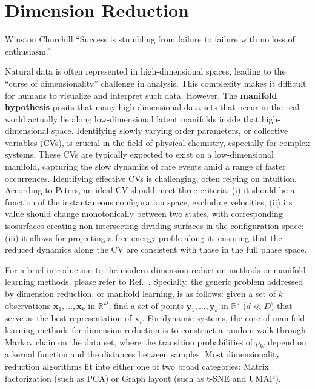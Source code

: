 \chapter{Dimension Reduction\label{chapter:DR}}
\begin{chapquote}{Winston Churchill%
	}
	``Success is stumbling from failure to failure with no loss of enthusiasm.''
\end{chapquote}

Natural data is often represented in high-dimensional spaces, leading to the ``curse of dimensionality'' challenge in analysis. This complexity makes it difficult for humans to visualize and interpret such data. However, The \textbf{manifold hypothesis} posits that many high-dimensional data sets that occur in the real world actually lie along low-dimensional latent manifolds inside that high-dimensional space. Identifying slowly varying order parameters, or collective variables (CVs), is crucial in the field of physical chemistry, especially for complex systems. These CVs are typically expected to exist on a low-dimensional manifold, capturing the slow dynamics of rare events amid a range of faster occurrences. Identifying effective CVs is challenging, often relying on intuition. According to Peters\cite{PetersARPC2016}, an ideal CV should meet three criteria: (i) it should be a function of the instantaneous configuration space, excluding velocities; (ii) its value should change monotonically between two states, with corresponding isosurfaces creating non-intersecting dividing surfaces in the configuration space; (iii) it allows for projecting a free energy profile along it, ensuring that the reduced dynamics along the CV are consistent with those in the full phase space.

For a brief introduction to the modern dimension reduction methods or manifold learning methods, please refer to Ref.~\cite{IzamanWIREsCS2012}. Specially, the generic problem addressed by dimension reduction, or manifold learning, is as follows: given a set of $k$ observations $\mathbf{x}_1,\dots,\mathbf{x}_k$ in $\mathbb{R}^D$, find a set of points $\mathbf{y}_1,\dots,\mathbf{y}_k$ in $\mathbb{R}^d$ ($d\ll D$) that serve as the best representation of $\mathbf{x}_i$. For dynamic systems, the core of manifold learning methods for dimension reduction is to construct a random walk through Markov chain on the data set, where the transition probabilities of $p_{kl}$ depend on a kernal function and the distances between samples. Most dimensionality reduction algorithms fit into either one of two broad categories: Matrix factorization (such as PCA) or Graph layout (such as t-SNE and UMAP).

